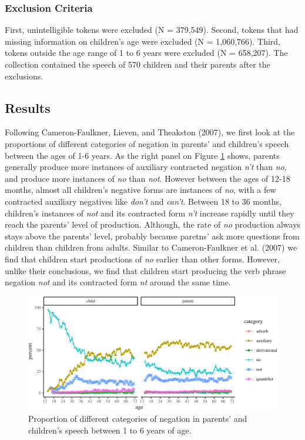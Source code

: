 \documentclass[man,floatsintext,draftall]{apa6}
\begin{document}
\hypertarget{exclusion-criteria}{%
\subsubsection{Exclusion Criteria}\label{exclusion-criteria}}

First, unintelligible tokens were excluded (N = 379,549). Second, tokens that had missing information on children's age were excluded (N = 1,060,766). Third, tokens outside the age range of 1 to 6 years were excluded (N = 658,207). The collection contained the speech of 570 children and their parents after the exclusions.

\hypertarget{results}{%
\subsection{Results}\label{results}}

Following Cameron-Faulkner, Lieven, and Theakston (2007), we first look at the proportions of different categories of negation in parents' and children's speech between the ages of 1-6 years. As the right panel on Figure \ref{fig:negationProportionPlot} shows, parents generally produce more instances of auxiliary contracted negation \emph{n't} than \emph{no}, and produce more instances of \emph{no} than \emph{not}. However between the ages of 12-18 months, almost all children's negative forms are instances of \emph{no}, with a few contracted auxiliary negatives like \emph{don't} and \emph{can't}. Between 18 to 36 months, children's instances of \emph{not} and its contracted form \emph{n't} increase rapidly until they reach the parents' level of production. Although, the rate of \emph{no} production always stays above the parents' level, probably because paretns' ask more questions from children than children from adults. Similar to Cameron-Faulkner et al. (2007) we find that children start productions of \emph{no} earlier than other forms. However, unlike their conclusions, we find that children start producing the verb phrase negation \emph{not} and its contracted form \emph{nt} around the same time.

\begin{figure}
\centering
\includegraphics{negation_production_files/figure-latex/negationProportionPlot-1.pdf}
\caption{\label{fig:negationProportionPlot}Proportion of different categories of negation in parents' and children's speech between 1 to 6 years of age.}
\end{figure}
\end{document}
